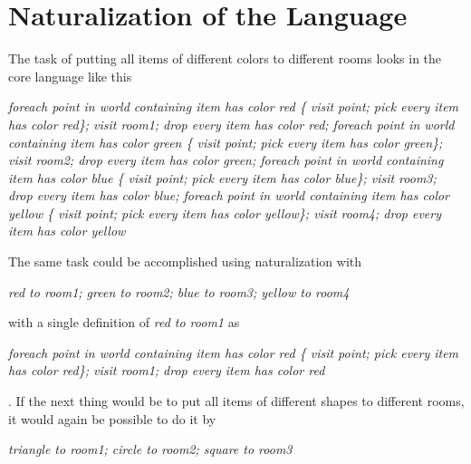 \section{Naturalization of the Language}

The task of putting all items of different colors to different rooms looks in the core language like this \\
\begin{displayquote}
 \textit{foreach point in world containing item has color red \{ visit point; pick every item has color red\}; visit room1; drop every item has color red; foreach point in world containing item has color green \{ visit point; pick every item has color green\}; visit room2; drop every item has color green; foreach point in world containing item has color blue \{ visit point; pick every item has color blue\}; visit room3; drop every item has color blue; foreach point in world containing item has color yellow \{ visit point; pick every item has color yellow\}; visit room4; drop every item has color yellow} 
\end{displayquote} 
 The same task could be accomplished using naturalization with 
\begin{displayquote} 
 \textit{red to room1; green to room2; blue to room3; yellow to room4}
\end{displayquote} 
  with a single definition of \textit{red to room1} as
  \begin{displayquote}
  \textit{foreach point in world containing item has color red \{ visit point; pick every item has color red\}; visit room1; drop every item has color red}
  \end{displayquote}.
  If the next thing would be to put all items of different shapes to different rooms, it would again be possible to do it by 
\begin{displayquote}  
   \textit{ triangle to room1; circle to room2; square to room3}
   \end{displayquote}